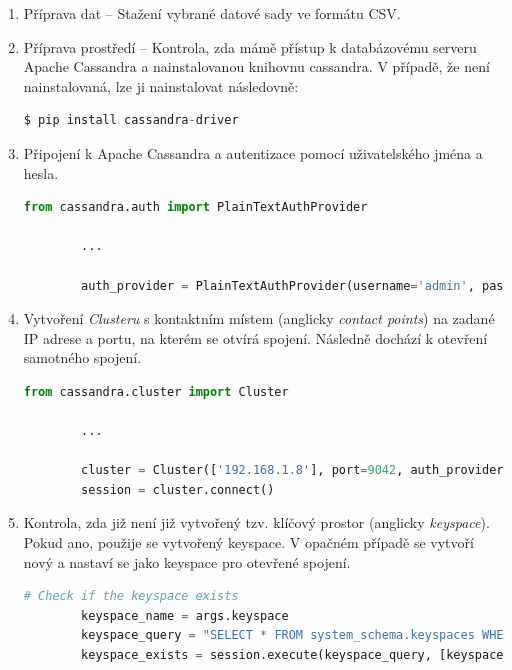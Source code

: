\documentclass[a4paper, 11pt]{article}
\begin{document}
        \begin{enumerate}
            \item Příprava dat -- Stažení vybrané datové sady ve formátu CSV.
            \item Příprava prostředí -- Kontrola, zda mámě přístup k databázovému serveru Apache Cassandra a nainstalovanou knihovnu cassandra. V případě, že není nainstalovaná, lze ji nainstalovat následovně:

            \begin{lstlisting}[style=NoSQL, language=SQL, framesep=10pt]
        $ pip install cassandra-driver            
            \end{lstlisting}            

            \item Připojení k Apache Cassandra a autentizace pomocí uživatelského jména a hesla.

            \begin{lstlisting}[style=Python, language=Python, framesep=10pt]
        from cassandra.auth import PlainTextAuthProvider

        ...
        
        auth_provider = PlainTextAuthProvider(username='admin', password='admin321')
            \end{lstlisting}

            \item Vytvoření \textit{Clusteru} s kontaktním místem (anglicky \textit{ contact points}) na zadané IP adrese a portu, na kterém se otvírá spojení. Následně dochází k otevření samotného spojení.


            \begin{lstlisting}[style=Python, language=Python, framesep=10pt]
        from cassandra.cluster import Cluster

        ...
        
        cluster = Cluster(['192.168.1.8'], port=9042, auth_provider=auth_provider)
        session = cluster.connect()
            \end{lstlisting}

            \item Kontrola, zda již není již vytvořený tzv. klíčový prostor (anglicky \textit{keyspace}). Pokud ano, použije se vytvořený keyspace. V opačném případě se vytvoří nový a nastaví se jako keyspace pro otevřené spojení.

            \begin{lstlisting}[style=Python, language=Python, framesep=10pt, breaklines=true]
        # Check if the keyspace exists
        keyspace_name = args.keyspace
        keyspace_query = "SELECT * FROM system_schema.keyspaces WHERE keyspace_name = %s"
        keyspace_exists = session.execute(keyspace_query, [keyspace_name])
    

\end{lstlisting}
\end{enumerate}
\end{document}
